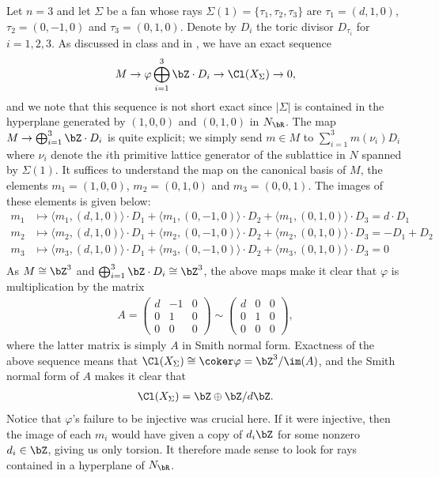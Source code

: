 \begin{homework}[e]
\begin{prf}
		Let $n = 3$ and let $\Sigma$ be a fan whose rays $\Sigma(1) = \{\tau_1, \tau_2, \tau_3\}$ are $\tau_1 = (d,1,0)$, $\tau_2 = (0,-1,0)$ and $\tau_3 = (0,1,0)$. Denote by $D_i$ the toric divisor $D_{\tau_i}$ for $i = 1,2,3$. As discussed in class and in \cite[Theorem 4.1.3.]{Cox-Little-Schenck}, we have an exact sequence
		\begin{align*}
			M \to{\varphi} \bigoplus_{i=1}^3 \bZ\cdot D_i \to \Cl(X_\Sigma) \to 0,
		\end{align*}
		and we note that this sequence is not short exact since $|\Sigma|$ is contained in the hyperplane generated by $(1,0,0)$ and $(0,1,0)$ in $N_\bR$. The map $M \to \bigoplus_{i=1}^3 \bZ\cdot D_i$ is quite explicit; we simply send $m \in M$ to $\sum_{i=1}^3m(\nu_i)D_i$ where $\nu_i$ denote the $i$th primitive lattice generator of the sublattice in $N$ spanned by $\Sigma(1)$. It suffices to understand the map on the canonical basis of $M$, the elements $m_1 = (1,0,0)$, $m_2 = (0,1,0)$ and $m_3 = (0,0,1)$. The images of these elements is given below:
		\begin{align*}
			m_1 &\mapsto \langle m_1, (d,1,0) \rangle \cdot D_1 + \langle m_1,(0,-1,0) \rangle \cdot D_2 + \langle m_1,(0,1,0) \rangle\cdot D_3 = d\cdot D_1 \\
			m_2 &\mapsto \langle m_2, (d,1,0) \rangle \cdot D_1 + \langle m_2,(0,-1,0) \rangle \cdot D_2 + \langle m_2,(0,1,0) \rangle\cdot D_3 = -D_1 + D_2 \\
			m_3 &\mapsto \langle m_3, (d,1,0) \rangle \cdot D_1 + \langle m_3,(0,-1,0) \rangle \cdot D_2 + \langle m_3,(0,1,0) \rangle\cdot D_3 = 0 \\
		\end{align*}
		As $M \cong \bZ^3$ and $\bigoplus_{i=1}^3 \bZ\cdot D_i \cong \bZ^3$, the above maps make it clear that $\varphi$ is multiplication by the matrix
		\begin{align*}
			A = \begin{pmatrix}	
				d & -1 & 0 \\
				0 & 1 & 0 \\
				0 & 0 & 0
			\end{pmatrix} \sim 
			\begin{pmatrix}	
				d & 0 & 0 \\
				0 & 1 & 0 \\
				0 & 0 & 0
			\end{pmatrix},
		\end{align*}
		where the latter matrix is simply $A$ in Smith normal form. Exactness of the above sequence means that $\Cl(X_\Sigma) \cong \coker \varphi = \bZ^3/\im(A)$, and the Smith normal form of $A$ makes it clear that
		\begin{align*}
			\Cl(X_\Sigma) = \bZ \oplus \bZ/d\bZ.
		\end{align*}
		Notice that $\varphi$'s failure to be injective was crucial here. If it were injective, then the image of each $m_i$ would have given a copy of $d_i\bZ$ for some nonzero $d_i \in \bZ$, giving us only torsion. It therefore made sense to look for rays contained in a hyperplane of $N_\bR$.


\end{prf}
\end{homework}
